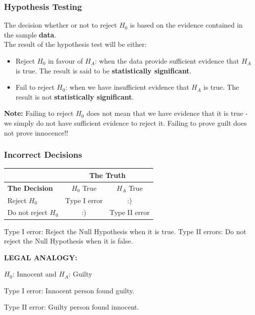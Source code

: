 \documentclass[12pt,xcolor=dvipsnames,handout,mathserif,aspectratio=169]{beamer}
\newcommand{\bbl}[1]{{\color{NavyBlue} \textbf{#1}}}
\begin{document}
\begin{frame}
\frametitle{Hypothesis Testing}
The decision whether or not to reject $H_0$ is based on the evidence contained in the sample \bbl{data}.\\
\vspace*{0.5cm}
The result of the hypothesis test will be either:
\begin{itemize}
\item Reject $H_0$ in favour of $H_A$: when the data provide sufficient evidence that $H_A$ is true. The result is said to be \bbl{statistically significant}.
\vspace{0.5cm}
\item Fail to reject $H_0$: when we have insufficient evidence that $H_A$ is true. The result is not \bbl{statistically significant}.
\end{itemize}
\vspace{0.5cm}
\pause
\bbl{Note:} Failing to reject $H_0$ does not mean that we have evidence that it is true - we simply do not have sufficient evidence to reject it. Failing to prove guilt does not prove innocence!!
\end{frame}

\begin{frame}
\frametitle{Incorrect Decisions}
\vspace*{0.5cm}
\begin{center}{\large{
\begin{tabular}{|l|cc|} \hline
& \multicolumn{2}{|c|}{\bbl{The Truth}}\\ \hline
\bbl{The Decision}&$H_0$ True & $H_A$ True\\ \hline
Reject $H_0$&Type I error& :)\\
Do not reject $H_0$&:)&Type II error\\ \hline
\end{tabular}}}\end{center}

Type I error: Reject the Null Hypothesis when it is true.
Type II errors: Do not reject the Null Hypothesis when it is false.
\pause

\vspace*{0.5cm}
\bbl{LEGAL ANALOGY:}

\vspace*{0.2cm}
$H_0$: Innocent  and  $H_A$: Guilty

\vspace*{0.3cm}
Type I error: Innocent person found guilty.

\vspace*{0.3cm}
Type II error: Guilty person found innocent.
\end{frame}
\end{document}
